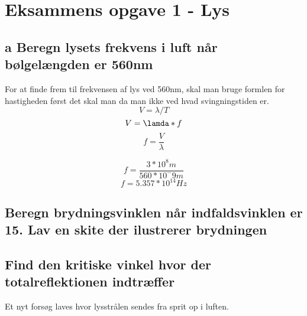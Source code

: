\section{Eksammens opgave 1 - Lys}\label{sec:eks1}
\subsection{a Beregn lysets frekvens i luft når bølgelængden er 560nm}
For at finde frem til frekvensen af lys ved 560nm, skal man bruge formlen for hastigheden først det skal man da man ikke ved hvad svingningstiden er.
\begin{equation}
    V=\lambda/T
\end{equation}
\begin{equation}
    V=\lamda * f
\end{equation}
\begin{equation}
    f=\frac{V}{\lambda}
\end{equation}

\begin{equation}
    f=\frac{3*10^8 m}{560*10^-9 m}
\end{equation}
\begin{equation}
    f=5.357*10^14 Hz
\end{equation}
\subsection{Beregn brydningsvinklen når indfaldsvinklen er 15. Lav en skite der ilustrerer brydningen}

\subsection{Find den kritiske vinkel hvor der totalreflektionen indtræffer}
Et nyt forsøg laves hvor lysstrålen sendes fra sprit op i luften. 